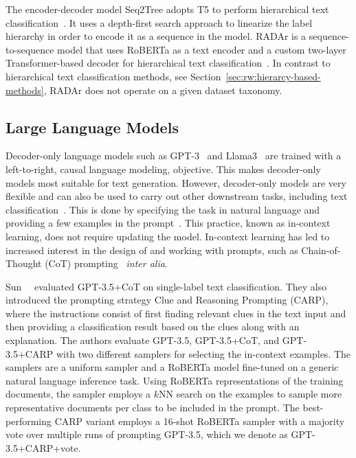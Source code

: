 \documentclass[lettersize,journal]{IEEEtran}
\begin{document}
The encoder-decoder model Seq2Tree adopts T5 to perform hierarchical text classification~\cite{seq2tree}.
It uses a depth-first search approach to linearize the label hierarchy in order to encode it as a sequence in the model.
RADAr is a sequence-to-sequence model that uses RoBERTa as a text encoder and a custom two-layer Transformer-based decoder for hierarchical text classification~\cite{radar}.
In contrast to hierarchical text classification methods, see Section~\ref{sec:rw:hierarcy-based-methods}, RADAr does not operate on a given dataset taxonomy.

\subsection{Large Language Models}

Decoder-only language models such as GPT-3~\cite{DBLP:conf/nips/BrownMRSKDNSSAA20} and Llama3~\cite{llama3}
are trained with a left-to-right, \ie causal language modeling, objective. This makes decoder-only models most suitable for text generation. 
However, decoder-only models are very flexible and can also be used to carry out other downstream tasks, including text classification~\cite{DBLP:conf/nips/BrownMRSKDNSSAA20,radfordLanguageModelsAre}. 
This is done by specifying the task in natural language and providing a few examples in the prompt~\cite{DBLP:conf/nips/BrownMRSKDNSSAA20}. 
This practice, known as in-context learning, does not require updating the model. 
In-context learning has led to increased interest in the design of and working with prompts, such as Chain-of-Thought (CoT) prompting~\cite{chain-of-thought} \emph{inter alia}.

Sun~\etal~\cite{carp} evaluated GPT-3.5+CoT on single-label text classification. They also introduced the prompting strategy Clue and Reasoning Prompting (CARP), where the instructions consist of first finding relevant clues in the text input and then providing a classification result based on the clues along with an explanation. 
The authors evaluate GPT-3.5, GPT-3.5+CoT, and GPT-3.5+CARP with two different samplers for selecting the in-context examples.
The samplers are a uniform sampler and a RoBERTa model fine-tuned on a generic natural language inference task.
Using RoBERTa representations of the training documents, the sampler employs a $k$NN search on the examples to sample more representative documents per class to be included in the prompt.
The best-performing CARP variant employs a 16-shot RoBERTa sampler with a majority vote over multiple runs of prompting GPT-3.5, which we denote as GPT-3.5+CARP+vote.
\end{document}
